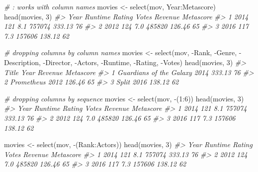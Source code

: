\documentclass[
]{book}
\newenvironment{Shaded}{\begin{snugshade}}{\end{snugshade}}
\newcommand{\CommentTok}[1]{\textcolor[rgb]{0.56,0.35,0.01}{\textit{#1}}}
\newcommand{\DecValTok}[1]{\textcolor[rgb]{0.00,0.00,0.81}{#1}}
\newcommand{\FunctionTok}[1]{\textcolor[rgb]{0.00,0.00,0.00}{#1}}
\newcommand{\NormalTok}[1]{#1}
\newcommand{\OtherTok}[1]{\textcolor[rgb]{0.56,0.35,0.01}{#1}}
\newcommand{\SpecialCharTok}[1]{\textcolor[rgb]{0.00,0.00,0.00}{#1}}
\begin{document}
\begin{Shaded}
\begin{Highlighting}[]
\CommentTok{\# : works with column names}
\NormalTok{movies }\OtherTok{\textless{}{-}} \FunctionTok{select}\NormalTok{(mov, Year}\SpecialCharTok{:}\NormalTok{Metascore)}
\FunctionTok{head}\NormalTok{(movies, }\DecValTok{3}\NormalTok{)}
\CommentTok{\#\textgreater{}   Year Runtime Rating  Votes Revenue Metascore}
\CommentTok{\#\textgreater{} 1 2014     121    8.1 757074  333.13        76}
\CommentTok{\#\textgreater{} 2 2012     124    7.0 485820  126.46        65}
\CommentTok{\#\textgreater{} 3 2016     117    7.3 157606  138.12        62}

\CommentTok{\# dropping columns by column names}
\NormalTok{movies }\OtherTok{\textless{}{-}} \FunctionTok{select}\NormalTok{(mov, }\SpecialCharTok{{-}}\NormalTok{Rank, }\SpecialCharTok{{-}}\NormalTok{Genre, }\SpecialCharTok{{-}}\NormalTok{Description, }
                  \SpecialCharTok{{-}}\NormalTok{Director, }\SpecialCharTok{{-}}\NormalTok{Actors, }\SpecialCharTok{{-}}\NormalTok{Runtime, }\SpecialCharTok{{-}}\NormalTok{Rating, }\SpecialCharTok{{-}}\NormalTok{Votes)}
\FunctionTok{head}\NormalTok{(movies, }\DecValTok{3}\NormalTok{)}
\CommentTok{\#\textgreater{}                     Title Year Revenue Metascore}
\CommentTok{\#\textgreater{} 1 Guardians of the Galaxy 2014  333.13        76}
\CommentTok{\#\textgreater{} 2              Prometheus 2012  126.46        65}
\CommentTok{\#\textgreater{} 3                   Split 2016  138.12        62}

\CommentTok{\# dropping columns by sequence}
\NormalTok{movies }\OtherTok{\textless{}{-}} \FunctionTok{select}\NormalTok{(mov, }\SpecialCharTok{{-}}\NormalTok{(}\DecValTok{1}\SpecialCharTok{:}\DecValTok{6}\NormalTok{))}
\FunctionTok{head}\NormalTok{(movies, }\DecValTok{3}\NormalTok{)}
\CommentTok{\#\textgreater{}   Year Runtime Rating  Votes Revenue Metascore}
\CommentTok{\#\textgreater{} 1 2014     121    8.1 757074  333.13        76}
\CommentTok{\#\textgreater{} 2 2012     124    7.0 485820  126.46        65}
\CommentTok{\#\textgreater{} 3 2016     117    7.3 157606  138.12        62}

\NormalTok{movies }\OtherTok{\textless{}{-}} \FunctionTok{select}\NormalTok{(mov, }\SpecialCharTok{{-}}\NormalTok{(Rank}\SpecialCharTok{:}\NormalTok{Actors))}
\FunctionTok{head}\NormalTok{(movies, }\DecValTok{3}\NormalTok{)}
\CommentTok{\#\textgreater{}   Year Runtime Rating  Votes Revenue Metascore}
\CommentTok{\#\textgreater{} 1 2014     121    8.1 757074  333.13        76}
\CommentTok{\#\textgreater{} 2 2012     124    7.0 485820  126.46        65}
\CommentTok{\#\textgreater{} 3 2016     117    7.3 157606  138.12        62}


\end{Highlighting}
\end{Shaded}
\end{document}

